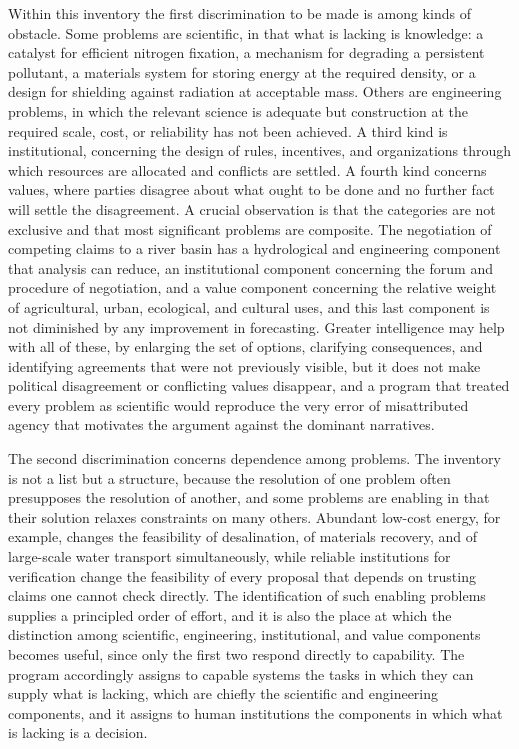 Within this inventory the first discrimination to be made is among kinds of obstacle. Some problems are scientific, in that what is lacking is knowledge: a catalyst for efficient nitrogen fixation, a mechanism for degrading a persistent pollutant, a materials system for storing energy at the required density, or a design for shielding against radiation at acceptable mass. Others are engineering problems, in which the relevant science is adequate but construction at the required scale, cost, or reliability has not been achieved. A third kind is institutional, concerning the design of rules, incentives, and organizations through which resources are allocated and conflicts are settled. A fourth kind concerns values, where parties disagree about what ought to be done and no further fact will settle the disagreement. A crucial observation is that the categories are not exclusive and that most significant problems are composite. The negotiation of competing claims to a river basin has a hydrological and engineering component that analysis can reduce, an institutional component concerning the forum and procedure of negotiation, and a value component concerning the relative weight of agricultural, urban, ecological, and cultural uses, and this last component is not diminished by any improvement in forecasting. Greater intelligence may help with all of these, by enlarging the set of options, clarifying consequences, and identifying agreements that were not previously visible, but it does not make political disagreement or conflicting values disappear, and a program that treated every problem as scientific would reproduce the very error of misattributed agency that motivates the argument against the dominant narratives.

The second discrimination concerns dependence among problems. The inventory is not a list but a structure, because the resolution of one problem often presupposes the resolution of another, and some problems are enabling in that their solution relaxes constraints on many others. Abundant low-cost energy, for example, changes the feasibility of desalination, of materials recovery, and of large-scale water transport simultaneously, while reliable institutions for verification change the feasibility of every proposal that depends on trusting claims one cannot check directly. The identification of such enabling problems supplies a principled order of effort, and it is also the place at which the distinction among scientific, engineering, institutional, and value components becomes useful, since only the first two respond directly to capability. The program accordingly assigns to capable systems the tasks in which they can supply what is lacking, which are chiefly the scientific and engineering components, and it assigns to human institutions the components in which what is lacking is a decision.

